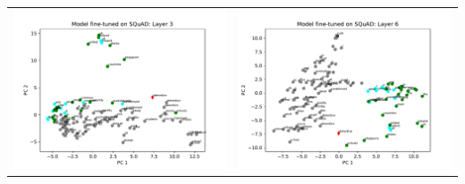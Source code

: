 \documentclass{article}
\begin{document}
	\begin{center}
		\begin{tabular}{ c c }
			\includegraphics[scale=0.4]{../badges/reproduced/visualization/squad/model-fine-tuned-on-squad--layer-3.pdf} &
			\includegraphics[scale=0.4]{../badges/reproduced/visualization/squad/model-fine-tuned-on-squad--layer-6.pdf}
		\end{tabular}
	\end{center}
\end{document}
